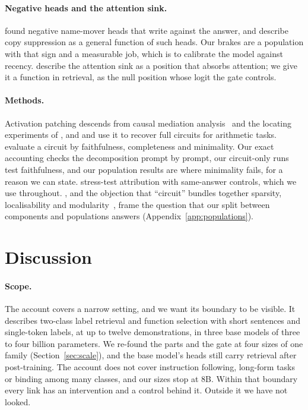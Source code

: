 \documentclass{article}
\begin{document}
\paragraph{Negative heads and the attention sink.} \citet{wang2022ioi} found negative name-mover heads that write against the answer, and \citet{mcdougall2023copysuppression} describe copy suppression as a general function of such heads. Our brakes are a population with that sign and a measurable job, which is to calibrate the model against recency. \citet{xiao2023sinks} describe the attention sink as a position that absorbs attention; we give it a function in retrieval, as the null position whose logit the gate controls.

\paragraph{Methods.} Activation patching descends from causal mediation analysis~\citep{vig2020mediation} and the locating experiments of \citet{meng2022rome}, and \citet{hanna2023greaterthan} and \citet{nanda2023grokking} use it to recover full circuits for arithmetic tasks. \citet{wang2022ioi} evaluate a circuit by faithfulness, completeness and minimality. Our exact accounting checks the decomposition prompt by prompt, our circuit-only runs test faithfulness, and our population results are where minimality fails, for a reason we can state. \citet{quirke2026stress} stress-test attribution with same-answer controls, which we use throughout. \citet{chen2024skillpath}, and the objection that ``circuit'' bundles together sparsity, localisability and modularity~\citep{bricken2026notcircuits}, frame the question that our split between components and populations answers (Appendix~\ref{app:populations}).

\section{Discussion}\label{sec:discussion}
\paragraph{Scope.} The account covers a narrow setting, and we want its boundary to be visible. It describes two-class label retrieval and function selection with short sentences and single-token labels, at up to twelve demonstrations, in three base models of three to four billion parameters. We re-found the parts and the gate at four sizes of one family (Section~\ref{sec:scale}), and the base model's heads still carry retrieval after post-training. The account does not cover instruction following, long-form tasks or binding among many classes, and our sizes stop at 8B. Within that boundary every link has an intervention and a control behind it. Outside it we have not looked.
\end{document}

